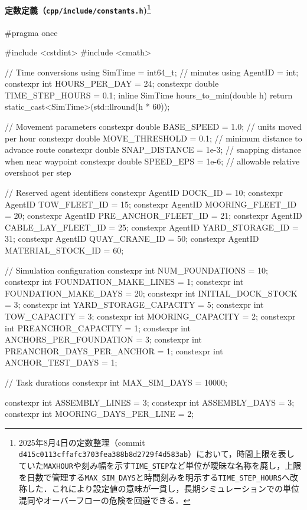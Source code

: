 \documentclass[10pt,letterpaper]{jsarticle}
\begin{document}
\paragraph{定数定義（\texttt{cpp/include/constants.h})\footnote{2025年8月4日の定数整理（commit \texttt{d415c0113cffafc3703fea388b8d2729f4d583ab}）において，時間上限を表していた\texttt{MAXHOUR}や刻み幅を示す\texttt{TIME\_STEP}など単位が曖昧な名称を廃し，上限を日数で管理する\texttt{MAX\_SIM\_DAYS}と時間刻みを明示する\texttt{TIME\_STEP\_HOURS}へ改称した．これにより設定値の意味が一貫し，長期シミュレーションでの単位混同やオーバーフローの危険を回避できる．}}
\begin{cppcode}
#pragma once

#include <cstdint>
#include <cmath>

// Time conversions
using SimTime = int64_t; // minutes
using AgentID = int;
constexpr int HOURS_PER_DAY = 24;
constexpr double TIME_STEP_HOURS = 0.1;
inline SimTime hours_to_min(double h) {
    return static_cast<SimTime>(std::llround(h * 60));
}

// Movement parameters
constexpr double BASE_SPEED = 1.0;            // units moved per hour
constexpr double MOVE_THRESHOLD = 0.1;        // minimum distance to advance route
constexpr double SNAP_DISTANCE = 1e-3;        // snapping distance when near waypoint
constexpr double SPEED_EPS = 1e-6;            // allowable relative overshoot per step

// Reserved agent identifiers
constexpr AgentID DOCK_ID = 10;
constexpr AgentID TOW_FLEET_ID = 15;
constexpr AgentID MOORING_FLEET_ID = 20;
constexpr AgentID PRE_ANCHOR_FLEET_ID = 21;
constexpr AgentID CABLE_LAY_FLEET_ID = 25;
constexpr AgentID YARD_STORAGE_ID = 31;
constexpr AgentID QUAY_CRANE_ID = 50;
constexpr AgentID MATERIAL_STOCK_ID = 60;

// Simulation configuration
constexpr int NUM_FOUNDATIONS = 10;
constexpr int FOUNDATION_MAKE_LINES = 1;
constexpr int FOUNDATION_MAKE_DAYS = 20;
constexpr int INITIAL_DOCK_STOCK = 3;
constexpr int YARD_STORAGE_CAPACITY = 5;
constexpr int TOW_CAPACITY = 3;
constexpr int MOORING_CAPACITY = 2;
constexpr int PREANCHOR_CAPACITY = 1;
constexpr int ANCHORS_PER_FOUNDATION = 3;
constexpr int PREANCHOR_DAYS_PER_ANCHOR = 1;
constexpr int ANCHOR_TEST_DAYS = 1;

// Task durations
constexpr int MAX_SIM_DAYS = 10000;

constexpr int ASSEMBLY_LINES = 3;
constexpr int ASSEMBLY_DAYS = 3;
constexpr int MOORING_DAYS_PER_LINE = 2;


\end{cppcode}
\end{document}
